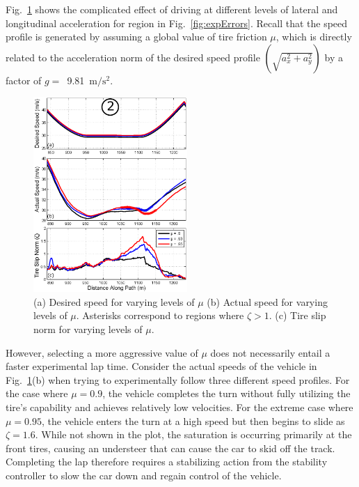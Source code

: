 \documentclass[9pt,shortpaper,twoside,web]{ieeecolor}
\newcommand*\circled[1]{\tikz[baseline=(char.base)]{
            \node[shape=circle,draw,inner sep=2pt] (char) {#1};}}
\begin{document}
Fig.~\ref{fig:t2} shows the complicated effect of driving at different levels of lateral and longitudinal acceleration for region \circled{2} in Fig.~\ref{fig:expErrors}. Recall that the
speed profile is generated by assuming a global value of tire friction $\mu$, which is directly related to the acceleration norm of
the desired speed profile $\left(\sqrt{a_x^2 + a_y^2}\right)$ by a factor of \mbox{$g =$ 9.81 $\mathrm{m/s^2}$}. 


\begin{figure}
\centering
\includegraphics[width=2.3in]{figures/t2res.eps}
\caption[Desired speed for varying levels of $\mu$ - region 2]{(a) Desired speed for varying levels of $\mu$ (b) Actual speed for varying levels of $\mu$. Asterisks correspond to 
regions where $\zeta > 1$. (c) Tire slip norm for varying levels of $\mu$. }
\label{fig:t2}
\end{figure}

However, selecting a more aggressive value of $\mu$ does not necessarily entail a faster experimental lap time. Consider the actual speeds of the vehicle in
Fig.~\ref{fig:t2}(b) when trying to experimentally follow three different speed profiles. For the case where $\mu = 0.9$, the vehicle completes
the turn without fully utilizing the tire's capability and achieves relatively low velocities. For the extreme case where $\mu = 0.95$, the
vehicle enters the turn at a high speed but then begins to slide as $\zeta = 1.6$. While not shown in the plot, the saturation
is occurring primarily at the front tires, causing an understeer that can cause the car to skid off the track. Completing the lap therefore requires a stabilizing
action from the stability controller to slow the car down and regain control of the vehicle. 
\end{document}
